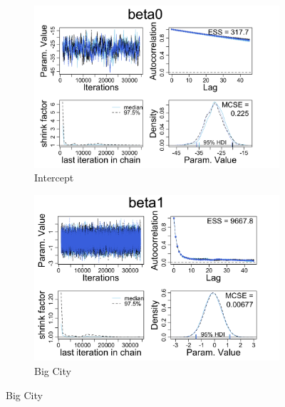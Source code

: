 \documentclass[12pt,english]{article}
\begin{document}
\begin{figure}[h]
 
\begin{subfigure}{0.5\textwidth}
\includegraphics[scale = 0.25]{beta0.png} 
\caption{Intercept}
\label{fig:beta0}
\end{subfigure}
\begin{subfigure}{0.5\textwidth}
\includegraphics[scale = 0.25]{beta1.png}
\caption{Big City}
\label{fig:subim2}
\end{subfigure}
\label{fig:beta1}
\end{figure}
\end{document}
